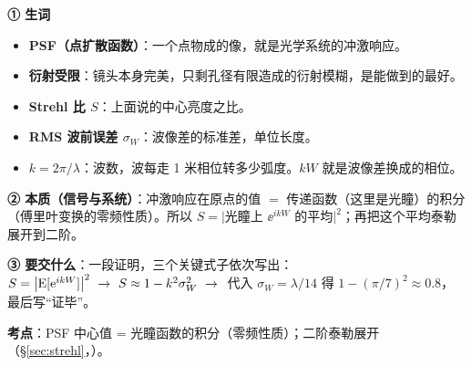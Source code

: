 \label{rd:v-strehl}
\begin{idea}[读题：概念与要交什么]
\textbf{① 生词}
\begin{itemize}
\item \textbf{PSF（点扩散函数）}：一个点物成的像，就是光学系统的冲激响应。
\item \textbf{衍射受限}：镜头本身完美，只剩孔径有限造成的衍射模糊，是能做到的最好。
\item \textbf{Strehl 比 $S$}：上面说的中心亮度之比。
\item \textbf{RMS 波前误差 $\sigma_W$}：波像差的标准差，单位长度。
\item \textbf{$k=2\pi/\lambda$}：波数，波每走 1 米相位转多少弧度。$kW$ 就是波像差换成的相位。
\end{itemize}
\textbf{② 本质（信号与系统）}：冲激响应在原点的值 $=$ 传递函数（这里是光瞳）的积分（傅里叶变换的零频性质）。所以 $S=\big|\text{光瞳上 }\ee^{ikW}\text{ 的平均}\big|^2$；再把这个平均泰勒展开到二阶。

\textbf{③ 要交什么}：一段证明，三个关键式子依次写出：
$S=\big|\E[\ee^{ikW}]\big|^2\ \to\ S\approx1-k^2\sigma_W^2\ \to\ $ 代入 $\sigma_W=\lambda/14$ 得 $1-(\pi/7)^2\approx0.8$，最后写“证毕”。
\end{idea}


\textbf{考点}：PSF 中心值 = 光瞳函数的积分（零频性质）；二阶泰勒展开（§\ref{sec:strehl}，\pageref{sec:strehl}）。

